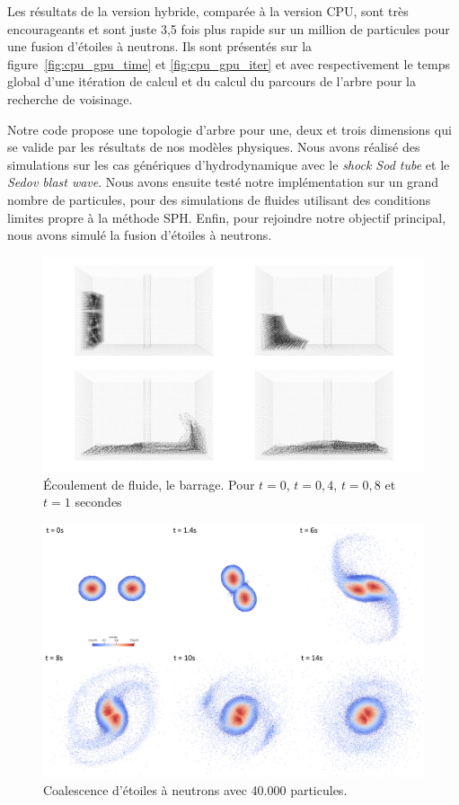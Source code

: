 \documentclass[12pt,a4paper]{report}
\begin{document}
Les résultats de la version hybride, comparée à la version CPU, sont très encourageants et sont juste 3,5 fois plus rapide sur un million de particules pour une fusion d'étoiles à neutrons. 
Ils sont présentés sur la figure~\ref{fig:cpu_gpu_time} et \ref{fig:cpu_gpu_iter} et avec respectivement le temps global d'une itération de calcul et du calcul du parcours de l'arbre pour la recherche de voisinage. 

Notre code propose une topologie d'arbre pour une, deux et trois dimensions qui se valide par les résultats de nos modèles physiques. 
Nous avons réalisé des simulations sur les cas génériques d'hydrodynamique avec le \textit{shock Sod tube} et le \textit{Sedov blast wave}.
Nous avons ensuite testé notre implémentation sur un grand nombre de particules, pour des simulations de fluides utilisant des conditions limites propre à la méthode SPH.
Enfin, pour rejoindre notre objectif principal, nous avons simulé la fusion d'étoiles à neutrons. 

\begin{figure}[t!]
\centering
\includegraphics[width=\textwidth]{../figures/sph/fluid_flow}
\caption{Écoulement de fluide, le barrage. Pour $t=0$, $t=0,4$, $t=0,8$ et $t=1$ secondes}
\label{fig:fluid_simulation}
\end{figure}

\begin{figure}[t!]
\centering
\includegraphics[width=\textwidth]{../figures/flecsph/bns_merger}
\caption{Coalescence d'étoiles à neutrons avec 40.000 particules.}
\label{fig:bns_simulation}
\end{figure}
\end{document}
